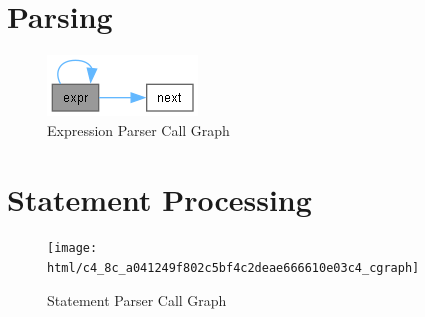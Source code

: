 \documentclass{article}
\begin{document}
\section{Parsing}
\begin{figure}[h]
    \centering
    \includegraphics[width=\textwidth]{html/c4_8c_a030d86c976b02e5e18fa50e4027fb2e7_cgraph}
    \caption{Expression Parser Call Graph}
\end{figure}

\section{Statement Processing}
\begin{figure}[h]
    \centering
    \texttt{[image: html/c4\_8c\_a041249f802c5bf4c2deae666610e03c4\_cgraph]}
    \caption{Statement Parser Call Graph}
\end{figure}
\end{document}
